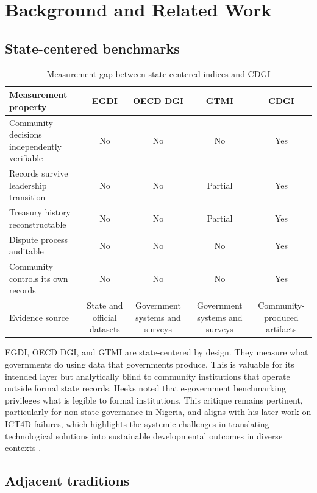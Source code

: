 \documentclass[sigconf,anonymous]{acmart}
\begin{document}
\section{Background and Related Work}

\subsection{State-centered benchmarks}

\begin{table}[t]
\caption{Measurement gap between state-centered indices and CDGI}
\label{tab:gap}
\small
\begin{tabularx}{\textwidth}{Ycccc}
\toprule
Measurement property & EGDI & OECD DGI & GTMI & CDGI \\
\midrule
Community decisions independently verifiable & No & No & No & Yes \\
Records survive leadership transition & No & No & Partial & Yes \\
Treasury history reconstructable & No & No & Partial & Yes \\
Dispute process auditable & No & No & No & Yes \\
Community controls its own records & No & No & No & Yes \\
Evidence source & State and official datasets & Government systems and surveys & Government systems and surveys & Community-produced artifacts \\
\bottomrule
\end{tabularx}
\end{table}


EGDI, OECD DGI, and GTMI are state-centered by design. They measure what governments do using data that governments produce. This is valuable for its intended layer but analytically blind to community institutions that operate outside formal state records. Heeks \cite{heeks2006} noted that e-government benchmarking privileges what is legible to formal institutions. This critique remains pertinent, particularly for non-state governance in Nigeria, and aligns with his later work on ICT4D failures, which highlights the systemic challenges in translating technological solutions into sustainable developmental outcomes in diverse contexts \cite{heeks2002, heeks2003}.

\subsection{Adjacent traditions}
\end{document}
